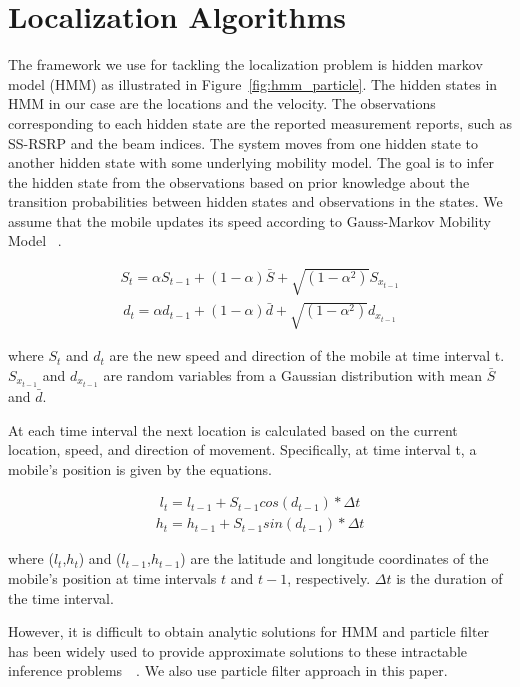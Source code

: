 \documentclass[conference, 10pt]{IEEEtran}
\begin{document}
\section{Localization Algorithms}
\label{sec:localalgo}

The framework we use for tackling the localization problem is hidden markov model (HMM) as illustrated 
in Figure~\ref{fig:hmm_particle}. The hidden states in HMM in our case are the locations and the velocity. 
The observations corresponding to each hidden state are the reported measurement reports, such as SS-RSRP and the beam indices.
The system moves from one hidden state to another hidden state with some underlying mobility model. 
The goal is to infer the hidden state from the observations based on
prior knowledge about the transition probabilities between hidden states and
observations in the states. We assume that the mobile updates its speed according to Gauss-Markov Mobility Model ~\cite{Camp2002}.

\begin{align}
S_t = \alpha S_{t-1}+(1-\alpha)\bar{S}+\sqrt{(1-\alpha^2)}S_{x_{t-1}}
\label{eqn:speed}
\end{align}
\begin{align}
d_t = \alpha d_{t-1}+(1-\alpha)\bar{d}+\sqrt{(1-\alpha^2)}d_{x_{t-1}}
\label{eqn:speed}
\end{align}

 where $S_t$ and $d_t$ are the new speed and direction of the mobile at time interval t. $S_{x_{t-1}}$ and $d_{x_{t-1}}$
 are random variables from a Gaussian distribution with mean $\bar{S}$ and $\bar{d}$.
 
 At each time interval the next location is calculated based on the current location, speed, and direction of movement.
Specifically, at time interval t, a mobile's position is given by the equations.

\begin{align}
	l_t = l_{t-1} +S_{t-1}cos(d_{t-1})*\Delta t
\label{eqn:mobilitymodelx}
\end{align}
\begin{align}
h_t = h_{t-1} +S_{t-1}sin(d_{t-1})*\Delta t
\label{eqn:mobilitymodely}
\end{align}

where ($l_t$,$h_t$) and ($l_{t-1}$,$h_{t-1}$) are the latitude and longitude coordinates of the mobile’s position 
at time intervals $t$ and $t-1$, respectively. $\Delta t$ is the duration of the time interval.

However, it is difficult to obtain analytic solutions for HMM and particle filter has been widely used to provide approximate solutions to these intractable inference problems~\cite{doucet2009tutorial}~\cite{ThrunParticleFilter}.
We also use particle filter approach in this paper. 
\end{document}
